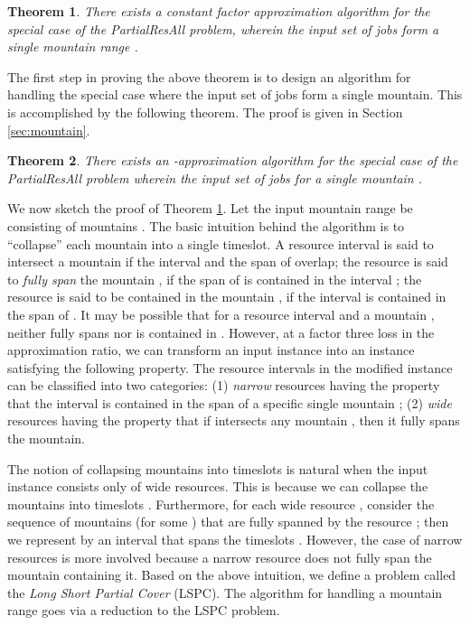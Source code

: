 \documentclass[11pt]{article}
\newtheorem{theorem}{Theorem}
\newcommand{\PResAll}{{\sc PartialResAll}}
\newcommand{\lspc}{{\sc LSPC}}
\begin{document}
\begin{theorem}
\label{thm:xCCC}
There exists a constant factor approximation algorithm for the special case of the {\PResAll} problem,
wherein the input set of jobs form a single mountain range .
\end{theorem}

The first step in proving the above theorem is to design an algorithm for handling the special case where the input set of jobs
form a single mountain. This is accomplished by the following theorem. The proof is given in 
Section \ref{sec:mountain}.

\begin{theorem}
\label{thm:xDDD}
There exists an -approximation algorithm for the special case of the {\PResAll} problem
wherein the input set of jobs for a single mountain .
\end{theorem}

We now sketch the proof of Theorem \ref{thm:xCCC}. 
Let the input mountain range be  consisting of mountains .
The basic intuition behind the algorithm is to ``collapse'' each mountain  into a single timeslot. 
A resource interval  is said to intersect a mountain  if the interval  and the span of 
 overlap; the resource  is said to {\em fully span} the mountain , if 
the span of  is contained in the interval ; the resource  is said to
be contained in the mountain , if the interval  is contained in the span of .
It may be possible that for a resource interval  and a mountain ,
neither  fully spans  nor is  contained in .
However, at a factor three loss in the approximation ratio, we can transform an input instance into an instance
satisfying the following property. The resource intervals in the modified instance can be 
classified into two categories: (1) {\em narrow} resources  having the property
that the interval  is contained in the span of a specific single mountain ;
(2) {\em wide} resources  having the property that 
if  intersects any mountain , then it fully spans the mountain. 

The notion of collapsing mountains into timeslots is natural when the input instance 
consists only of wide resources. 
This is because we can collapse the mountains  into timeslots .  
Furthermore, for each wide resource , consider the sequence of mountains 
 (for some ) that are fully spanned by the resource ;
then we represent  by an interval that spans the timeslots . 
However, the case of narrow resources is more involved
because a narrow resource does not fully span the mountain containing it. 
Based on the above intuition, we define a problem called the {\em Long Short Partial Cover} (\lspc).
The algorithm for handling a mountain range goes via a reduction to the {\lspc} problem.
\end{document}
